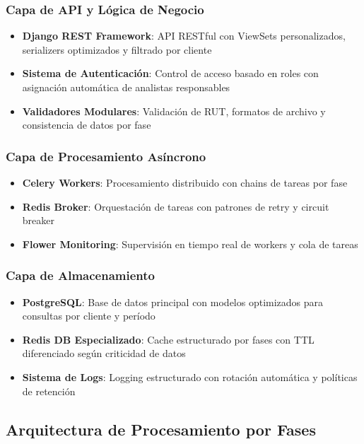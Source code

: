 \subsubsection{Capa de API y Lógica de Negocio}
\begin{itemize}
    \item \textbf{Django REST Framework}: API RESTful con ViewSets personalizados, serializers optimizados y filtrado por cliente
    \item \textbf{Sistema de Autenticación}: Control de acceso basado en roles con asignación automática de analistas responsables
    \item \textbf{Validadores Modulares}: Validación de RUT, formatos de archivo y consistencia de datos por fase
\end{itemize}

\subsubsection{Capa de Procesamiento Asíncrono}
\begin{itemize}
    \item \textbf{Celery Workers}: Procesamiento distribuido con chains de tareas por fase
    \item \textbf{Redis Broker}: Orquestación de tareas con patrones de retry y circuit breaker
    \item \textbf{Flower Monitoring}: Supervisión en tiempo real de workers y cola de tareas
\end{itemize}

\subsubsection{Capa de Almacenamiento}
\begin{itemize}
    \item \textbf{PostgreSQL}: Base de datos principal con modelos optimizados para consultas por cliente y período
    \item \textbf{Redis DB Especializado}: Cache estructurado por fases con TTL diferenciado según criticidad de datos
    \item \textbf{Sistema de Logs}: Logging estructurado con rotación automática y políticas de retención
\end{itemize}

\subsection{Arquitectura de Procesamiento por Fases}

